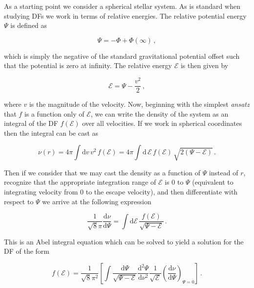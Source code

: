 As a starting point we consider a spherical stellar system. As is standard when studying DFs we work in terms of relative energies. The relative potential energy $\Psi$ is defined as 

\begin{equation}
    \label{ch1:eq:relative-potential-energy}
    \Psi = -\Phi + \Phi(\infty)\,,
\end{equation}

\noindent which is simply the negative of the standard gravitational potential offset such that the potential is zero at infinity. The relative energy $\mathcal{E}$ is then given by

\begin{equation}
    \label{ch1:eq:relative-energy}
    \mathcal{E} = \Psi - \frac{v^{2}}{2}\,,
\end{equation}

\noindent where $v$ is the magnitude of the velocity. Now, beginning with the simplest \textit{ansatz} that $f$ is a function only of $\mathcal{E}$, we can write the density of the system as an integral of the DF $f(\mathcal{E})$ over all velocities. If we work in spherical coordinates then the integral can be cast as 

\begin{equation}
    \label{ch1:eq:spherical-df-density}
    \nu(r) = 4\pi \int \mathrm{d} v \, v^{2} \, f(\mathcal{E}) = 4\pi \int \mathrm{d} \, \mathcal{E} \, f(\mathcal{E}) \, \sqrt{ 2(\Psi - \mathcal{E}) }\,.
\end{equation}

\noindent Then if we consider that we may cast the density as a function of $\Psi$ instead of $r$, recognize that the appropriate integration range of $\mathcal{E}$ is 0 to $\Psi$ (equivalent to integrating velocity from 0 to the escape velocity), and then differentiate with respect to $\Psi$ we arrive at the following expression

\begin{equation}
    \label{ch1:eq:spherical-df-density-derivative}
    \frac{1}{\sqrt{8}\pi} \frac{\mathrm{d} \nu}{\mathrm{d} \Psi} =  \int \mathrm{d} \mathcal{E} \, \frac{ f(\mathcal{E}) }{ \sqrt{\Psi - \mathcal{E}} }\,.
\end{equation}

\noindent This is an Abel integral equation which can be solved to yield a solution for the DF of the form

\begin{equation}
    \label{ch1:eq:eddington-inversion-df}
    f(\mathcal{E}) = \frac{1}{\sqrt{8}\pi^2} \left[ \int \frac{\mathrm{d} \Psi}{\sqrt{\Psi - \mathcal{E}}} \frac{\mathrm{d}^{2} \Psi}{\mathrm{d}\nu^{2}} \frac{1}{\sqrt{\mathcal{E}}} \left( \frac{\mathrm{d} \nu}{\mathrm{d} \Psi} \right)_{\Psi = 0} \right] \,.
\end{equation}

